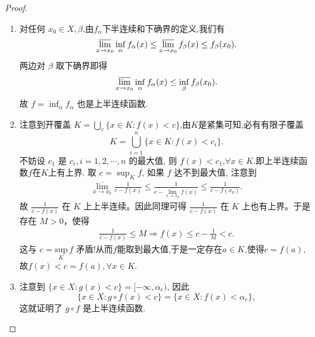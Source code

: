 \documentclass[../../main.tex]{subfiles}
\begin{document}
\begin{proof}
\begin{enumerate}
\item 对任何 \(x_{0}\in X,\beta\),由$f_{\alpha}$下半连续和下确界的定义,我们有
\[
\varlimsup_{x \to x_{0}}\inf_{\alpha}f_{\alpha}(x)\leq\varlimsup_{x \to x_{0}}f_{\beta}(x)\leq f_{\beta}(x_{0}).
\]
两边对 \(\beta\) 取下确界即得
\[
\varlimsup_{x \to x_{0}}\inf_{\alpha}f_{\alpha}(x)\leq\inf_{\beta}f_{\beta}(x_{0}).
\]
故 \(f = \inf_{\alpha}f_{\alpha}\) 也是上半连续函数.

\item 注意到开覆盖 \(K=\bigcup_{c}\{x\in K:f(x)<c\}\),由$K$是紧集可知,必有有限子覆盖
\[
K=\bigcup_{i = 1}^{n}\{x\in K:f(x)<c_{i}\}.
\]
不妨设 \(c_{1}\) 是 \(c_{i},i = 1,2,\cdots,n\) 的最大值, 则 \(f(x)<c_{1}\),\(\forall x\in K\).即上半连续函数$f$在$K$上有上界.  取 \(c=\sup_{K}f\), 如果 \(f\) 达不到最大值, 注意到
\begin{align*}
\underset{x\rightarrow x_0}{\overline{\lim }}\frac{1}{c-f(x)}\leqslant \frac{1}{c-\underset{x\rightarrow x_0}{\overline{\lim }}f(x)}\leqslant \frac{1}{c-f(x_0)}.
\end{align*}
故 $\frac{1}{c-f(x)}$ 在 $K$ 上上半连续。因此同理可得 $\frac{1}{c-f(x)}$ 在 $K$ 上也有上界。于是存在 $M>0$，使得
\begin{align*}
\frac{1}{c-f(x)}\leqslant M \Rightarrow f(x) \leqslant c-\frac{1}{M}<c.
\end{align*}
这与 $c=\underset{K}{\mathrm{sup}}\,f$ 矛盾!从而$f$能取到最大值,于是一定存在$a\in K$,使得$c=f(a)$,故$f(x)<c=f(a),\forall x\in K$.

\item 注意到 \(\{x\in X:g(x)<c\}=[-\infty,\alpha_{c})\), 因此
\[
\{x\in X:g\circ f(x)<c\}=\{x\in X:f(x)<\alpha_{c}\},
\]
这就证明了 \(g\circ f\) 是上半连续函数.
\end{enumerate}
\end{proof}
\end{document}
